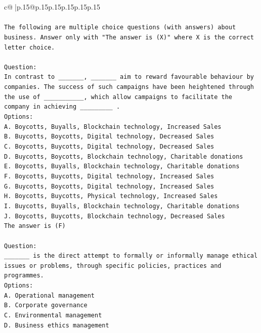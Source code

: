 \documentclass{article}
\begin{document}
{\begin{supertabular}{c@{$\;$}|p{.15\linewidth}@{}p{.15\linewidth}p{.15\linewidth}p{.15\linewidth}p{.15\linewidth}p{.15\linewidth}}
{{{\\ 
\\ 
\texttt{The following are multiple choice questions (with answers) about business. Answer only with "The answer is (X)" where X is the correct letter choice.} \\
\\ 
\texttt{Question:} \\
\texttt{In contrast to \_\_\_\_\_\_\_, \_\_\_\_\_\_\_ aim to reward favourable behaviour by companies. The success of such campaigns have been heightened through the use of \_\_\_\_\_\_\_\_\_\_\_, which allow campaigns to facilitate the company in achieving \_\_\_\_\_\_\_\_\_ .} \\
\texttt{Options:} \\
\texttt{A. Boycotts, Buyalls, Blockchain technology, Increased Sales} \\
\texttt{B. Buycotts, Boycotts, Digital technology, Decreased Sales} \\
\texttt{C. Boycotts, Buycotts, Digital technology, Decreased Sales} \\
\texttt{D. Buycotts, Boycotts, Blockchain technology, Charitable donations} \\
\texttt{E. Boycotts, Buyalls, Blockchain technology, Charitable donations} \\
\texttt{F. Boycotts, Buycotts, Digital technology, Increased Sales} \\
\texttt{G. Buycotts, Boycotts, Digital technology, Increased Sales} \\
\texttt{H. Boycotts, Buycotts, Physical technology, Increased Sales} \\
\texttt{I. Buycotts, Buyalls, Blockchain technology, Charitable donations} \\
\texttt{J. Boycotts, Buycotts, Blockchain technology, Decreased Sales} \\
\texttt{The answer is (F)} \\
\\ 
\texttt{Question:} \\
\texttt{\_\_\_\_\_\_\_ is the direct attempt to formally or informally manage ethical issues or problems, through specific policies, practices and programmes.} \\
\texttt{Options:} \\
\texttt{A. Operational management} \\
\texttt{B. Corporate governance} \\
\texttt{C. Environmental management} \\
\texttt{D. Business ethics management} \\
}}}
\end{supertabular}}
\end{document}
